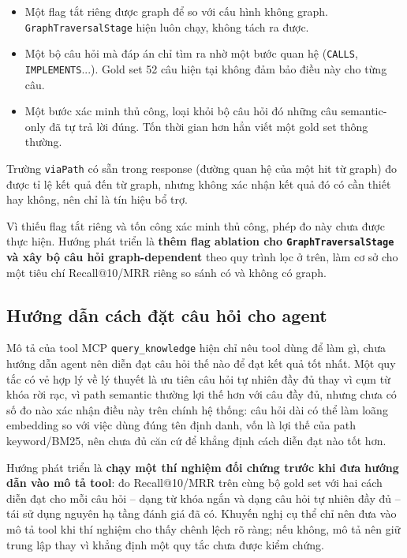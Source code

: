 \begin{itemize}
  \item Một flag tắt riêng được graph để so với cấu hình không graph. \texttt{GraphTraversalStage} hiện luôn chạy, không tách ra được.
  \item Một bộ câu hỏi mà đáp án chỉ tìm ra nhờ một bước quan hệ (\texttt{CALLS}, \texttt{IMPLEMENTS}...). Gold set 52 câu hiện tại không đảm bảo điều này cho từng câu.
  \item Một bước xác minh thủ công, loại khỏi bộ câu hỏi đó những câu semantic-only đã tự trả lời đúng. Tốn thời gian hơn hẳn viết một gold set thông thường.
\end{itemize}

Trường \texttt{viaPath} có sẵn trong response (đường quan hệ của một hit từ graph) đo được tỉ lệ kết quả đến từ graph, nhưng không xác nhận kết quả đó có cần thiết hay không, nên chỉ là tín hiệu bổ trợ.

Vì thiếu flag tắt riêng và tốn công xác minh thủ công, phép đo này chưa được thực hiện. Hướng phát triển là \textbf{thêm flag ablation cho \texttt{GraphTraversalStage} và xây bộ câu hỏi graph-dependent} theo quy trình lọc ở trên, làm cơ sở cho một tiêu chí Recall@10/MRR riêng so sánh có và không có graph.

\subsection{Hướng dẫn cách đặt câu hỏi cho agent}

Mô tả của tool MCP \texttt{query\_knowledge} hiện chỉ nêu tool dùng để làm gì, chưa hướng dẫn agent nên diễn đạt câu hỏi thế nào để đạt kết quả tốt nhất. Một quy tắc có vẻ hợp lý về lý thuyết là ưu tiên câu hỏi tự nhiên đầy đủ thay vì cụm từ khóa rời rạc, vì path semantic thường lợi thế hơn với câu đầy đủ, nhưng chưa có số đo nào xác nhận điều này trên chính hệ thống: câu hỏi dài có thể làm loãng embedding so với việc dùng đúng tên định danh, vốn là lợi thế của path keyword/BM25, nên chưa đủ căn cứ để khẳng định cách diễn đạt nào tốt hơn.

Hướng phát triển là \textbf{chạy một thí nghiệm đối chứng trước khi đưa hướng dẫn vào mô tả tool}: đo Recall@10/MRR trên cùng bộ gold set với hai cách diễn đạt cho mỗi câu hỏi -- dạng từ khóa ngắn và dạng câu hỏi tự nhiên đầy đủ -- tái sử dụng nguyên hạ tầng đánh giá đã có. Khuyến nghị cụ thể chỉ nên đưa vào mô tả tool khi thí nghiệm cho thấy chênh lệch rõ ràng; nếu không, mô tả nên giữ trung lập thay vì khẳng định một quy tắc chưa được kiểm chứng.

